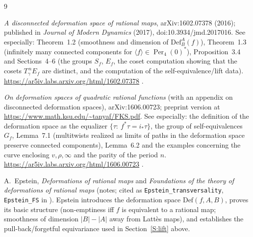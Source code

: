 \documentclass[11pt]{amsart}
\begin{document}
\begin{thebibliography}{9}

 \emph{A disconnected deformation space of rational maps},
arXiv:1602.07378 (2016); published in \emph{Journal of Modern Dynamics}
(2017), doi:10.3934/jmd.2017016. See especially: Theorem~1.2 (smoothness
and dimension of $\mathrm{Def}^A_B(f)$), Theorem~1.3 (infinitely many
connected components for $\langle f\rangle\in\operatorname{Per}_4(0)^*$),
Proposition~3.4 and Sections~4--6 (the groups $S_f$, $E_f$, the coset
computation showing that the cosets $T_\gamma^{\,n}E_f$ are distinct, and
the computation of the self-equivalence/lift data).
\url{https://ar5iv.labs.arxiv.org/html/1602.07378} .

 \emph{On deformation spaces of quadratic rational
functions} (with an appendix on disconnected deformation spaces),
arXiv:1606.00723; preprint version at
\url{https://www.math.ksu.edu/~tanyaf/FKS.pdf}. See especially: the
definition of the deformation space as the equalizer
$\{\tau:\ f^*\tau=i_*\tau\}$, the group of self-equivalences $G_f$,
Lemma~7.1 (multitwists realized as limits of paths in the deformation
space preserve connected components), Lemma~6.2 and the examples
concerning the curve enclosing $v,\rho,\infty$ and the parity of the
period $n$.
\url{https://ar5iv.labs.arxiv.org/html/1606.00723} .

 A.~Epstein, \emph{Deformations of rational maps} and
\emph{Foundations of the theory of deformations of rational maps} (notes;
cited as \texttt{Epstein\_transversality}, \texttt{Epstein\_FS} in
\cite{Luo,Firsova}). Epstein introduces the deformation space
$\mathrm{Def}(f,A,B)$, proves its basic structure (non-emptiness iff $f$ is
equivalent to a rational map; smoothness of dimension $|B|-|A|$ away from
Latt\`es maps), and establishes the pull-back/forgetful equivariance used
in Section~\ref{S:lift} above.

\end{thebibliography}
\end{document}
